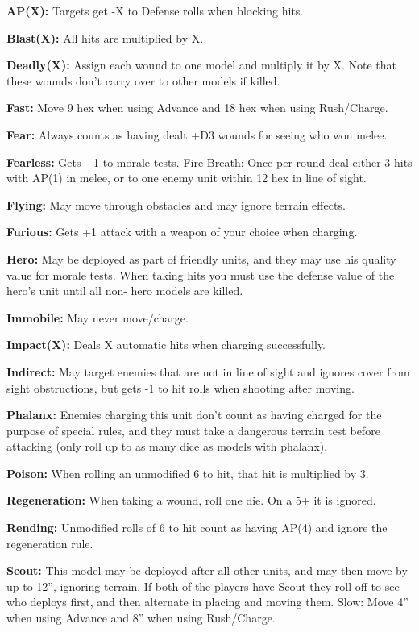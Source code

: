 \documentclass[6pt]{scrreport}
\begin{document}
\textbf{AP(X):} Targets get -X to Defense rolls
when blocking hits.

\textbf{Blast(X):} All hits are multiplied by X.

\textbf{Deadly(X):} Assign each wound to one
model and multiply it by X. Note that
these wounds don't carry over to other
models if killed.

\textbf{Fast:} Move 9 hex when using Advance and
18 hex when using Rush/Charge.

\textbf{Fear:} Always counts as having dealt +D3
wounds for seeing who won melee.

\textbf{Fearless:} Gets +1 to morale tests.
Fire Breath: Once per round deal either
3 hits with AP(1) in melee, or to one
enemy unit within 12 hex in line of sight.

\textbf{Flying:} May move through obstacles
and may ignore terrain effects.

\textbf{Furious:} Gets +1 attack with a weapon
of your choice when charging.

\textbf{Hero:} May be deployed as part of
friendly units, and they may use his
quality value for morale tests. When
taking hits you must use the defense
value of the hero’s unit until all non-
hero models are killed.

\textbf{Immobile:} May never move/charge.

\textbf{Impact(X):} Deals X automatic hits when
charging successfully.

\textbf{Indirect:} May target enemies that are
not in line of sight and ignores cover
from sight obstructions, but gets -1 to
hit rolls when shooting after moving.

\textbf{Phalanx:} Enemies charging this unit
don’t count as having charged for the
purpose of special rules, and they must
take a dangerous terrain test before
attacking (only roll up to as many dice
as models with phalanx).

\textbf{Poison:} When rolling an unmodified 6
to hit, that hit is multiplied by 3.

\textbf{Regeneration:} When taking a wound,
roll one die. On a 5+ it is ignored.

\textbf{Rending:} Unmodified rolls of 6 to hit
count as having AP(4) and ignore the
regeneration rule.

\textbf{Scout:} This model may be deployed
after all other units, and may then move
by up to 12”, ignoring terrain. If both of
the players have Scout they roll-off to
see who deploys first, and then alternate
in placing and moving them.
Slow: Move 4” when using Advance
and 8” when using Rush/Charge.
\end{document}
